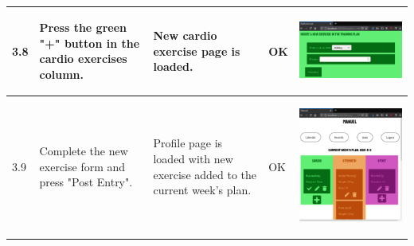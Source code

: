 \documentclass[12pt,twoside,titlepage,a4paper]{article}
\theoremstyle{definicion}
\theoremstyle{lema}
\theoremstyle{teorema}
\theoremstyle{corolario}
\theoremstyle{ejemplo}
\theoremstyle{nota}
\begin{document}
\begin{table}[!h]
\begin{tabular}{|m{0.6cm}|m{2.9cm}|m{3.6cm}|m{1.1cm}|m{5.9cm}|}
		\hline
		3.8 & Press the green "+" button in the cardio exercises column. & New cardio exercise page is loaded. & OK &
		\begin{center}\includegraphics[scale=0.24]{userpage4-newcardio.png}\end{center} \\
		\hline
		3.9 & Complete the new exercise form and press "Post Entry". & Profile page is loaded with new exercise added to
		the current week's plan. & OK &
		\begin{center}\includegraphics[scale=0.24]{newcardio-userpage6.png}\end{center} \\

\end{tabular}
\end{table}
\end{document}
